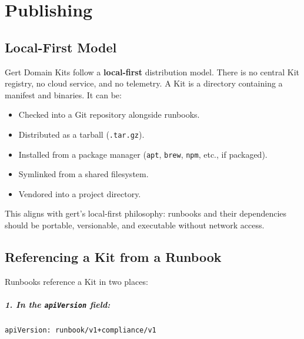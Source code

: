 
\chapter{Publishing}
\label{ch:publishing}

\section{Local-First Model}
\label{sec:local-first}

Gert Domain Kits follow a \textbf{local-first} distribution model. There is no
central Kit registry, no cloud service, and no telemetry. A Kit is a directory
containing a manifest and binaries. It can be:

\begin{itemize}
  \item Checked into a Git repository alongside runbooks.
  \item Distributed as a tarball (\texttt{.tar.gz}).
  \item Installed from a package manager (\texttt{apt}, \texttt{brew},
    \texttt{npm}, etc., if packaged).
  \item Symlinked from a shared filesystem.
  \item Vendored into a project directory.
\end{itemize}

This aligns with gert's local-first philosophy: runbooks and their dependencies
should be portable, versionable, and executable without network access.

\section{Referencing a Kit from a Runbook}
\label{sec:kit-reference}

Runbooks reference a Kit in two places:

\paragraph{1. In the \texttt{apiVersion} field:}

\begin{verbatim}
apiVersion: runbook/v1+compliance/v1
\end{verbatim}

